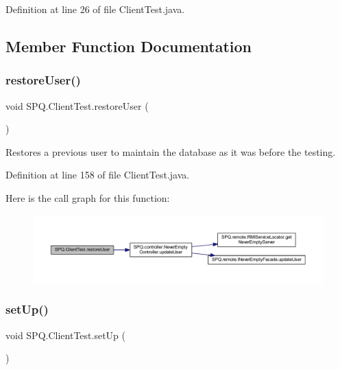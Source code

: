 Definition at line 26 of file Client\+Test.\+java.



\subsection{Member Function Documentation}
\mbox{\label{class_s_p_q_1_1_client_test_acc91cf7e3927e95fc4515abeae043969}} 
\subsubsection{\texorpdfstring{restore\+User()}{restoreUser()}}
{\footnotesize\ttfamily void S\+P\+Q.\+Client\+Test.\+restore\+User (\begin{DoxyParamCaption}{ }\end{DoxyParamCaption})}

Restores a previous user to maintain the database as it was before the testing. 

Definition at line 158 of file Client\+Test.\+java.

Here is the call graph for this function\+:\nopagebreak
\begin{figure}[H]
\begin{center}
\leavevmode
\includegraphics[width=350pt]{class_s_p_q_1_1_client_test_acc91cf7e3927e95fc4515abeae043969_cgraph}
\end{center}
\end{figure}
\mbox{\label{class_s_p_q_1_1_client_test_abcdab9dbc12c8a65ebbfb96877e4d5a1}} 
\subsubsection{\texorpdfstring{set\+Up()}{setUp()}}
{\footnotesize\ttfamily void S\+P\+Q.\+Client\+Test.\+set\+Up (\begin{DoxyParamCaption}{ }\end{DoxyParamCaption})}

